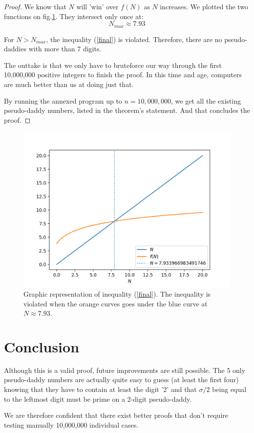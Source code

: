 \documentclass[a4paper, 11pt]{report}
\begin{document}
\begin{proof}
	We know that $N$ will 'win' over $f(N)$ as $N$ increases. We plotted the two functions on fig.\ref{plot}. They intersect only once at:
	$$N_{max}\approx7.93$$
	
	For $N> N_{max}$, the inequality (\ref{final}) is violated. Therefore, there are no pseudo-daddies with more than 7 digits.
	
	The outtake is that we only have to bruteforce our way through the first 10,000,000 positive integers to finish the proof. In this time and age, computers are much better than us at doing just that. 
	
	By running the annexed program up to $n=10,000,000$, we get all the existing pseudo-daddy numbers, listed in the theorem's statement. And that concludes the proof.
\end{proof}

\begin{figure}[htbp]
\begin{center}
	\includegraphics{plot.png}
\caption{Graphic representation of inequality (\ref{final}). The inequality is violated when the orange curves goes under the blue curve at $N\approx7.93$.}
\label{plot}
\end{center}
\end{figure}

\section{Conclusion}
	Although this is a valid proof, future improvements are still possible. The 5 only pseudo-daddy numbers are actually quite easy to guess (at least the first four) knowing that they have to contain at least the digit '2' and that $\sigma/2$ being equal to the leftmost digit must be prime on a 2-digit pseudo-daddy. 
	
	We are therefore confident that there exist better proofs that don't require testing manually 10,000,000 individual cases.

%
%
\end{document}
